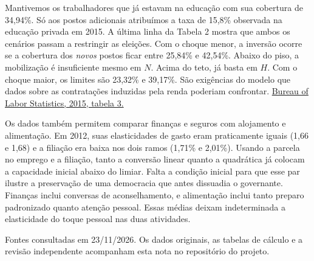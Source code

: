\documentclass[11pt,a4paper]{article}
\newcommand{\subtitulo}[1]{\par\smallskip{\large\bfseries\color{azul}#1\par}\nobreak}
\begin{document}
\subtitulo{A condição específica desse par}
Mantivemos os trabalhadores que já estavam na educação com sua cobertura de 34,94\%. Só aos postos adicionais atribuímos a taxa de 15,8\% observada na educação privada em 2015. A última linha da Tabela 2 mostra que ambos os cenários passam a restringir as eleições. Com o choque menor, a inversão ocorre se a cobertura dos \emph{novos} postos ficar entre 25,84\% e 42,54\%. Abaixo do piso, a mobilização é insuficiente mesmo em \(N\). Acima do teto, já basta em \(H\). Com o choque maior, os limites são 23,32\% e 39,17\%. São exigências do modelo que dados sobre as contratações induzidas pela renda poderiam confrontar. \href{https://www.bls.gov/news.release/archives/union2_01282016.htm}{Bureau of Labor Statistics, 2015, tabela 3.}

Os dados também permitem comparar finanças e seguros com alojamento e alimentação. Em 2012, suas elasticidades de gasto eram praticamente iguais (1,66 e 1,68) e a filiação era baixa nos dois ramos (1,71\% e 2,01\%). Usando a parcela no emprego e a filiação, tanto a conversão linear quanto a quadrática já colocam a capacidade inicial abaixo do limiar. Falta a condição inicial para que esse par ilustre a preservação de uma democracia que antes dissuadia o governante. Finanças inclui conversas de aconselhamento, e alimentação inclui tanto preparo padronizado quanto atenção pessoal. Essas médias deixam indeterminada a elasticidade do toque pessoal nas duas atividades.

\vfill
{\footnotesize Fontes consultadas em 23/11/2026. Os dados originais, as tabelas de cálculo e a revisão independente acompanham esta nota no repositório do projeto.}
\end{document}
